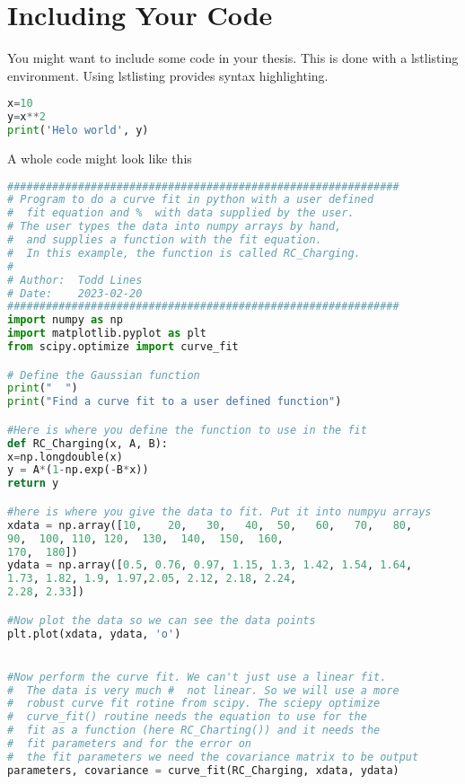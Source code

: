 \chapter{Including Your Code} \label{AppendixCode}
\label{app:Talk}

You might want to include some code in your thesis. This is done with a lstlisting environment. Using lstlisting provides syntax highlighting. 

\begin{lstlisting}[language=Python] 
x=10
y=x**2
print('Helo world', y)
\end{lstlisting}

A whole code might look like this

\small
\begin{lstlisting}[language=Python]
#############################################################
# Program to do a curve fit in python with a user defined 
#  fit equation and %  with data supplied by the user.
# The user types the data into numpy arrays by hand,
#  and supplies a function with the fit equation.
#  In this example, the function is called RC_Charging.
#
# Author:  Todd Lines
# Date:    2023-02-20
#############################################################
import numpy as np
import matplotlib.pyplot as plt
from scipy.optimize import curve_fit

# Define the Gaussian function
print("  ")
print("Find a curve fit to a user defined function")

#Here is where you define the function to use in the fit
def RC_Charging(x, A, B):
x=np.longdouble(x)
y = A*(1-np.exp(-B*x))
return y

#here is where you give the data to fit. Put it into numpyu arrays
xdata = np.array([10,    20,   30,   40,  50,   60,   70,   80,   
90,  100, 110, 120,  130,  140,  150,  160,  
170,  180])
ydata = np.array([0.5, 0.76, 0.97, 1.15, 1.3, 1.42, 1.54, 1.64, 
1.73, 1.82, 1.9, 1.97,2.05, 2.12, 2.18, 2.24, 
2.28, 2.33])

#Now plot the data so we can see the data points
plt.plot(xdata, ydata, 'o')


#Now perform the curve fit. We can't just use a linear fit. 
#  The data is very much #  not linear. So we will use a more 
#  robust curve fit rotine from scipy. The sciepy optimize 
#  curve_fit() routine needs the equation to use for the
#  fit as a function (here RC_Charting()) and it needs the 
#  fit parameters and for the error on 
#  the fit parameters we need the covariance matrix to be output
parameters, covariance = curve_fit(RC_Charging, xdata, ydata)


\end{lstlisting}
